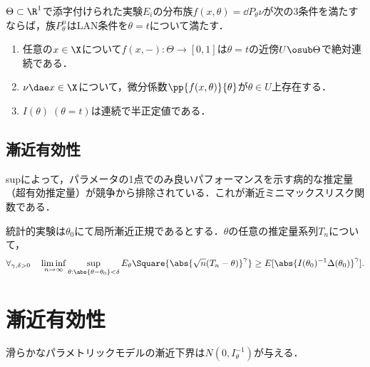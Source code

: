 \documentclass[uplatex,dvipdfmx]{jsreport}
\begin{document}
\begin{theorem}[Hajekの十分条件]
    $\Theta\subset\R^1$で添字付けられた実験$E_i$の分布族$f(x,\theta)=\dd{P_\theta}{\nu}$が次の3条件を満たすならば，族$P^n_\theta$はLAN条件を$\theta=t$について満たす．
    \begin{enumerate}
        \item 任意の$x\in\X$について$f(x,-):\Theta\to[0,1]$は$\theta=t$の近傍$U\osub\Theta$で絶対連続である．
        \item $\nu\dae x\in\X$について，微分係数$\pp{f(x,\theta)}{\theta}$が$\theta\in U$上存在する．
        \item $I(\theta)\;(\theta=t)$は連続で半正定値である．
    \end{enumerate}
\end{theorem}

\subsection{漸近有効性}

\begin{tcolorbox}[colframe=ForestGreen, colback=ForestGreen!10!white,breakable,colbacktitle=ForestGreen!40!white,coltitle=black,fonttitle=\bfseries\sffamily,
title=]
    supによって，パラメータの1点でのみ良いパフォーマンスを示す病的な推定量（超有効推定量）が競争から排除されている．これが漸近ミニマックスリスク関数である．
\end{tcolorbox}

\begin{theorem}[Hajekの不等式]
    統計的実験は$\theta_0$にて局所漸近正規であるとする．$\theta$の任意の推定量系列$T_n$について，
    \[\forall_{\gamma,\delta>0}\quad\liminf_{n\to\infty}\sup_{\theta:\abs{\theta-\theta_0}<\delta}E_\theta\Square{\abs{\sqrt{n}(T_n-\theta)}^\gamma}\ge E[\abs{I(\theta_0)^{-1}\Delta(\theta_0)}^\gamma].\]
\end{theorem}

\section{漸近有効性}

\begin{tcolorbox}[colframe=ForestGreen, colback=ForestGreen!10!white,breakable,colbacktitle=ForestGreen!40!white,coltitle=black,fonttitle=\bfseries\sffamily,
title=]
    滑らかなパラメトリックモデルの漸近下界は$N(0,I^{-1}_\theta)$が与える．
\end{tcolorbox}
\end{document}
